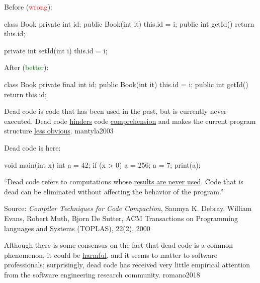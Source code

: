 \documentclass{article}
\begin{document}

\begin{multicols}{2}
Before (\textcolor{red}{wrong}):\par
{\small\begin{ffcode}
class Book
  private int id;
  public Book(int it)
    this.id = i;
  public int getId()
    return this.id;

  private int setId(int i)
    this.id = i;
\end{ffcode}
}
\par\columnbreak\par
After (\textcolor{green}{better}):\par
{\small\begin{ffcode}
class Book
  private final int id;
  public Book(int it)
    this.id = i;
  public int getId()
    return this.id;
\end{ffcode}
}
\end{multicols}
\plush{}

  {Dead code is code that has been used in the past, but is currently never executed. Dead code \ul{hinders} code \ul{comprehension} and makes the current program structure \ul{less obvious}.}
  {mantyla2003}

\begin{multicols}{2}
Dead code is here:\par
{\small\begin{ffcode}
void main(int x) {
  int a = 42;
  if (x > 0) {
    a = 256;
  }
  a = 7;
  print(a);
}
\end{ffcode}
}
\par\columnbreak\par
``Dead code refers to computations whose \ul{results are never used}. Code that is dead can be eliminated without affecting the behavior of the program.''\par
{\scriptsize Source: \textit{Compiler Techniques for Code Compaction}, Saumya K. Debray, William Evans, Robert Muth, Bjorn De Sutter, ACM Transactions on Programming languages and Systems (TOPLAS), 22(2), 2000 \par}
\end{multicols}
\plush{}

  {Although there is some consensus on the fact that dead code is a common phenomenon, it could be \ul{harmful}, and it seems to matter to software professionals; surprisingly, dead code has received very little empirical attention from the software engineering research community.}
  {romano2018}
\end{document}
